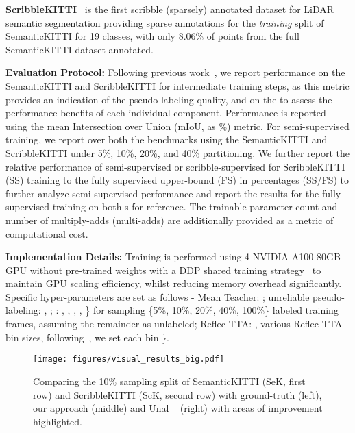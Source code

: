\documentclass[10pt,twocolumn,letterpaper]{article}
\newcommand\bdtitle[1]{\noindent\textbf{#1}}
\begin{document}
\bdtitle{ScribbleKITTI}~\cite{Unal_2022_CVPR} is the first scribble (\ie sparsely) annotated dataset for LiDAR semantic segmentation providing sparse annotations for the \textit{training} split of SemanticKITTI for 19 classes, with only 8.06\% of points from the full SemanticKITTI dataset annotated.

\bdtitle{Evaluation Protocol:} Following previous work~\cite{zhu2021cylindrical,jiang2021guided,Unal_2022_CVPR,kong2022lasermix}, we report performance on the SemanticKITTI and ScribbleKITTI {\trainset} for intermediate training steps, as this metric provides an indication of the pseudo-labeling quality, and on the {\validset} to assess the performance benefits of each individual component. Performance is reported using the mean Intersection over Union (mIoU, as \%) metric. For semi-supervised training, we report over both the benchmarks using the SemanticKITTI and ScribbleKITTI {\validset} under 5\%, 10\%, 20\%, and 40\% partitioning. We further report the relative performance of semi-supervised or scribble-supervised for ScribbleKITTI (SS) training to the fully supervised upper-bound (FS) in percentages (SS/FS) to further analyze semi-supervised performance and report the results for the fully-supervised training on both {\validset}s for reference. The trainable parameter count and number of multiply-adds (multi-adds) are additionally provided as a metric of computational cost.

\bdtitle{Implementation Details:} Training is performed using 4 NVIDIA A100 80GB GPU without pre-trained weights with a DDP shared training strategy~\cite{FairScale2021} to maintain GPU scaling efficiency, whilst reducing memory overhead significantly. Specific hyper-parameters are set as follows - Mean Teacher: ; unreliable pseudo-labeling: , ; {\samplshort}: , , , , \} for sampling \{5\%, 10\%, 20\%, 40\%, 100\%\} labeled training frames, assuming the remainder as unlabeled; Reflec-TTA: ,  various Reflec-TTA bin sizes, following~\cite{Unal_2022_CVPR}, we set each bin \}.




\begin{figure}[thp]
    \centering
    \texttt{[image: figures/visual\_results\_big.pdf]}
    \caption{Comparing the 10\% sampling split of SemanticKITTI (SeK, first row) and ScribbleKITTI (ScK, second row) {\validset} with ground-truth (left), our approach (middle) and Unal \etal~\cite{Unal_2022_CVPR} (right) with areas of improvement highlighted.}
    \label{fig:visual_results}
    \vspace{-0.4cm}
\end{figure}
\end{document}
